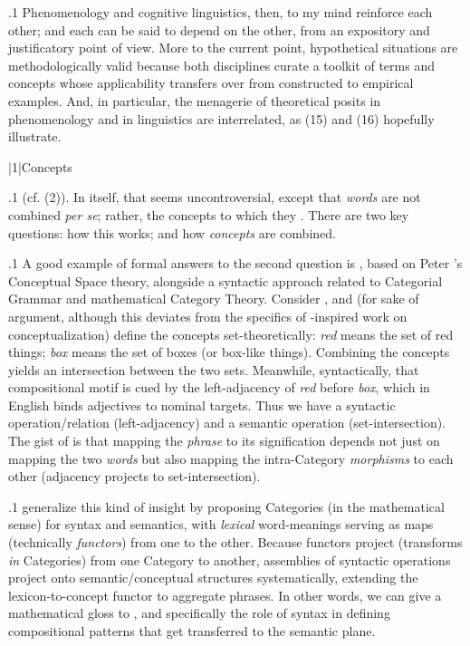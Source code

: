 \documentclass[11pt, twocolumn]{article}
\begin{document}
\p.1{%
\:\+Phenomenology and cognitive linguistics, then, to
my mind reinforce each other; and each can be said
to depend on the other, from an expository
and justificatory point of view. \>  More to the current
point, hypothetical situations are methodologically
valid because both disciplines curate a
toolkit of terms and concepts whose
applicability transfers over from constructed
to empirical examples. \>  And, in particular, the
menagerie of theoretical posits in
phenomenology and in linguistics are interrelated,
as \exsRef(15) and \exsRef(16) hopefully illustrate. \vspace{6pt}\;
}%


\s|1|{Concepts}

\p.1{%
\upAdj{2pt} (cf. (2)). \>  In itself, that seems uncontroversial,
except that \textit{words} are not combined \textit{per se}; rather,
the concepts to which they . \>  There are two
key questions: how this  works; and how
\textit{concepts} are combined.\<\;
}%

\p.1{%
\:\+A good example of formal answers to the second question is
\Boltetal{} , based on Peter \Gardenfors{}'s Conceptual Space
theory, alongside a syntactic approach related to Categorial Grammar
and mathematical Category Theory. \>  Consider , and
(for sake of argument, although this deviates from the
specifics of \Gardenfors{}-inspired work on conceptualization)
define the concepts set-theoretically:
\textit{red} means the set of red things; \textit{box} means the set of
boxes (or box-like things). \>  Combining the concepts yields
an intersection between the two sets. \>  Meanwhile,
syntactically, that compositional motif is cued by the left-adjacency of
\textit{red} before \textit{box}, which in English binds
adjectives to nominal targets. \>  Thus we have a
syntactic operation/relation (left-adjacency) and a
semantic operation (set-intersection). \>  The gist
of  is that mapping the \textit{phrase} to its signification
depends not just on mapping the two \textit{words} but also
mapping the intra-Category \textit{morphisms} to each other (adjacency
projects to set-intersection).\<\;
}%

\p.1{%
\:\+\Boltetal{} generalize this kind of insight by proposing
Categories (in the mathematical sense) for syntax and semantics,
with \textit{lexical} word-meanings serving as maps (technically
\textit{functors}) from one to the other. \>  Because functors
project  (transforms \textit{in} Categories) from one Category
to another, assemblies of syntactic operations
project onto semantic/conceptual structures systematically,
extending the lexicon-to-concept functor to aggregate
phrases. \>  In other words, we can give a mathematical gloss
to , and specifically the role of
syntax in defining compositional patterns that get transferred
to the semantic plane.\<\;
}%
\end{document}
